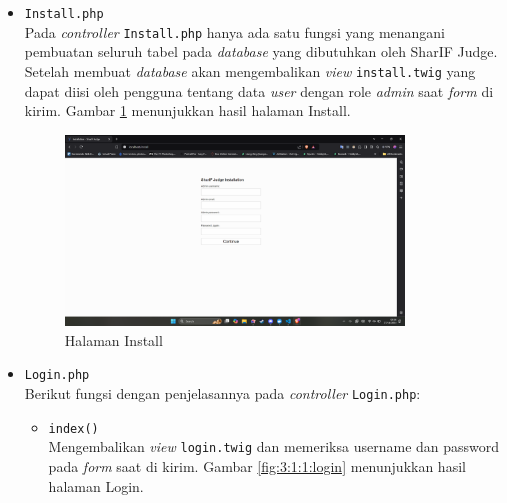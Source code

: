 \documentclass[a4paper,twoside]{article}
\begin{document}
\begin{enumerate}
\begin{itemize}
\begin{itemize}
			            \item \verb|Install.php| \\
			                  Pada \textit{controller} \verb|Install.php| hanya ada satu fungsi yang menangani pembuatan seluruh tabel pada \textit{database} yang dibutuhkan oleh SharIF Judge. Setelah membuat \textit{database} akan mengembalikan \textit{view} \verb|install.twig| yang dapat diisi oleh pengguna tentang data \textit{user} dengan role \textit{admin} saat \textit{form} di kirim. Gambar \ref{fig:3:1:1:install} menunjukkan hasil halaman Install.

			                  \begin{figure}[H]
				                  \centering
				                  \includegraphics[width=0.85\textwidth]{views/install.png}
				                  \caption{Halaman Install}
				                  \label{fig:3:1:1:install}
			                  \end{figure}


			            \item \verb|Login.php| \\
			                  Berikut fungsi dengan penjelasannya pada \textit{controller} \verb|Login.php|:

			                  \begin{itemize}
				                  \item \verb|index()| \\
				                        Mengembalikan \textit{view} \verb|login.twig| dan memeriksa username dan password pada \textit{form} saat di kirim. Gambar \ref{fig:3:1:1:login} menunjukkan hasil halaman Login.


\end{itemize}
\end{itemize}
\end{itemize}
\end{enumerate}
\end{document}
